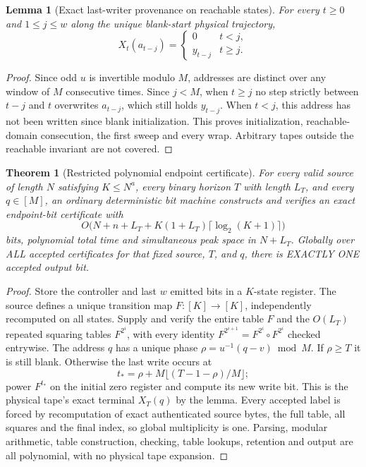 \documentclass[11pt]{article}
\newtheorem{theorem}{Theorem}
\newtheorem{lemma}{Lemma}
\begin{document}
\begin{lemma}[Exact last-writer provenance on reachable states]
For every $t\ge0$ and $1\le j\le w$ along the unique blank-start physical trajectory,
\[
X_t(a_{t-j})=
\begin{cases}0 & t<j,\\y_{t-j}&t\ge j.\end{cases}
\]
\end{lemma}
\begin{proof}
Since odd $u$ is invertible modulo $M$, addresses are distinct over any window of $M$ consecutive times. Since $j<M$, when $t\ge j$ no step strictly between $t-j$ and $t$ overwrites $a_{t-j}$, which still holds $y_{t-j}$. When $t<j$, this address has not been written since blank initialization. This proves initialization, reachable-domain consecution, the first sweep and every wrap. Arbitrary tapes outside the reachable invariant are not covered.
\end{proof}
\begin{theorem}[Restricted polynomial endpoint certificate]
For every valid source of length $N$ satisfying $K\le N^a$, every binary horizon $T$ with length $L_T$, and every $q\in[M]$, an ordinary deterministic bit machine constructs and verifies an exact endpoint-bit certificate with
\[
O\big(N+n+L_T+K(1+L_T)\lceil\log_2(K+1)\rceil\big)
\]
bits, polynomial total time and simultaneous peak space in $N+L_T$. Globally over ALL accepted certificates for that fixed source, $T$, and $q$, there is EXACTLY ONE accepted output bit.
\end{theorem}
\begin{proof}
Store the controller and last $w$ emitted bits in a $K$-state register. The source defines a unique transition map $F:[K]\to[K]$, independently recomputed on all states. Supply and verify the entire table $F$ and the $O(L_T)$ repeated squaring tables $F^{2^i}$, with every identity $F^{2^{i+1}}=F^{2^i}\circ F^{2^i}$ checked entrywise. The address $q$ has a unique phase $\rho=u^{-1}(q-v)\bmod M$. If $\rho\ge T$ it is still blank. Otherwise the last write occurs at
\[
t_*=\rho+M\lfloor(T-1-\rho)/M\rfloor;
\]
power $F^{t_*}$ on the initial zero register and compute its new write bit. This is the physical tape's exact terminal $X_T(q)$ by the lemma. Every accepted label is forced by recomputation of exact authenticated source bytes, the full table, all squares and the final index, so global multiplicity is one. Parsing, modular arithmetic, table construction, checking, table lookups, retention and output are all polynomial, with no physical tape expansion.
\end{proof}
\end{document}
